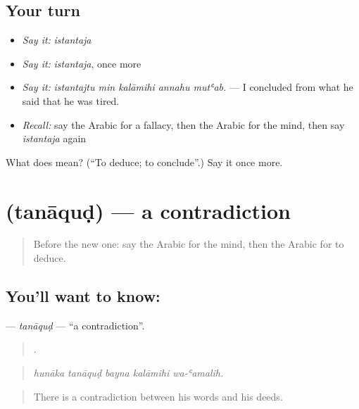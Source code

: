 \subsection*{Your turn}
\begin{itemize}
\raggedright
  \item \emph{Say it:} \emph{istantaja}
  \item \emph{Say it:} \emph{istantaja}, once more
  \item \emph{Say it:} \emph{istantajtu min kalāmihi annahu mutʿab.} — I concluded from what he said that he was tired.
  \item \emph{Recall:} say the Arabic for a fallacy, then the Arabic for the mind, then say \emph{istantaja} again
\end{itemize}

\begin{tcolorbox}[breakable,colback=teal!4,colframe=teal!35!black,title={Before you move on}]
What does  mean? (\textquotedblleft{}To deduce; to conclude\textquotedblright{}.) Say it once more.
\end{tcolorbox}
\section[\texorpdfstring{\ar{تناقض} (tanāquḍ)}{تناقض (tanāquḍ)}]{ (tanāquḍ) — a contradiction}

\label{lesson:AR-C362-tanaqud}



\begin{quote}
Before the new one: say the Arabic for the mind, then the Arabic for to deduce.
\end{quote}

\subsection*{You'll want to know: }
\textbf{} — \emph{tanāquḍ} — \textquotedblleft{}a contradiction\textquotedblright{}.

\begin{quote}
    .
\end{quote}

\begin{quote}
\emph{hunāka tanāquḍ bayna kalāmihi wa-ʿamalih.}
\end{quote}

\begin{quote}
There is a contradiction between his words and his deeds.
\end{quote}


